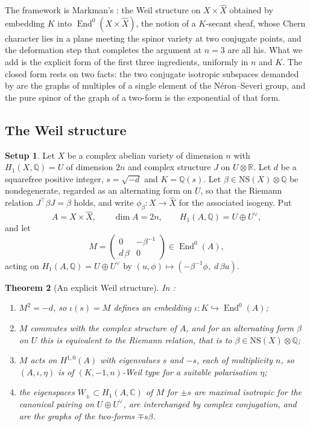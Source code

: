 \documentclass[11pt,reqno]{amsart}
\theoremstyle{plain}
\newtheorem{theorem}{Theorem}[section]
\theoremstyle{definition}
\newtheorem{setupenv}[theorem]{Setup}
\theoremstyle{remark}
\newcommand{\QQ}{\mathbb{Q}}
\newcommand{\RR}{\mathbb{R}}
\newcommand{\CC}{\mathbb{C}}
\newcommand{\NS}{\mathrm{NS}}
\DeclareMathOperator{\End}{End}
\begin{document}
The framework is Markman's \cite{Mar25a,Mar25b}: the Weil structure on
$X\times\widehat{X}$ obtained by embedding $K$ into
$\End^{0}(X\times\widehat{X})$, the notion of a $K$-secant sheaf, whose Chern
character lies in a plane meeting the spinor variety at two conjugate points,
and the deformation step that completes the argument at $n=3$ are all his.
What we add is the explicit form of the first three ingredients, uniformly in
$n$ and $K$. The closed form rests on two facts: the two conjugate isotropic
subspaces demanded by  are the graphs of multiples of
a single element of the N\'eron--Severi group, and the pure spinor of the graph
of a two-form is the exponential of that form.

\subsection{The Weil structure}

\begin{setupenv}\label{setup:construction}
Let $X$ be a complex abelian variety of dimension $n$ with
$H_{1}(X,\QQ)=U$ of dimension $2n$ and complex structure $J$ on
$U\otimes\RR$. Let $d$ be a squarefree positive integer, $s=\sqrt{-d}$ and
$K=\QQ(s)$. Let $\beta\in\NS(X)\otimes\QQ$ be nondegenerate, regarded as an
alternating form on $U$, so that the Riemann relation $J^{\top}\beta J=\beta$
holds, and write $\phi_{\beta}\colon X\to\widehat{X}$ for the associated
isogeny. Put
\[
  A=X\times\widehat{X},\qquad \dim A=2n,\qquad
  H_{1}(A,\QQ)=U\oplus U^{\vee},
\]
and let
\begin{equation}\label{eq:Mdef}
  M=\begin{pmatrix}0 & -\beta^{-1}\\[2pt] d\,\beta & 0\end{pmatrix}
  \in\End^{0}(A),
\end{equation}
acting on $H_{1}(A,\QQ)=U\oplus U^{\vee}$ by
$(u,\phi)\mapsto(-\beta^{-1}\phi,\;d\,\beta u)$.
\end{setupenv}

\begin{theorem}[An explicit Weil structure]\label{thm:explicitweil}
In :
\begin{enumerate}[label=\textup{(\roman*)}]
\item $M^{2}=-d$, so $\iota(s)=M$ defines an embedding
  $\iota\colon K\hookrightarrow\End^{0}(A)$;
\item $M$ commutes with the complex structure of $A$, and for an
  alternating form $\beta$ on $U$ this is equivalent to the Riemann relation,
  that is to $\beta\in\NS(X)\otimes\QQ$;
\item $M$ acts on $H^{1,0}(A)$ with eigenvalues $s$ and $-s$, each of
  multiplicity $n$, so $(A,\iota,\eta)$ is of $(K,-1,n)$-Weil type for a
  suitable polarisation $\eta$;
\item the eigenspaces $W_{\pm}\subset H_{1}(A,\CC)$ of $M$ for $\pm s$ are
  maximal isotropic for the canonical pairing on $U\oplus U^{\vee}$, are
  interchanged by complex conjugation, and are the graphs of the two-forms
  $\mp s\beta$.
\end{enumerate}
\end{theorem}
\end{document}
